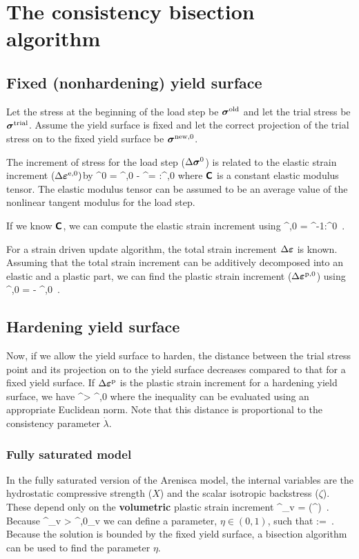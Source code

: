 \section{The consistency bisection algorithm}
\subsection{Fixed (nonhardening) yield surface}
Let the stress at the beginning of the load step be $\boldsymbol{\sigma}^{\text{old}}$ and let the trial stress be 
$\boldsymbol{\sigma}^{\text{trial}}$.  Assume the yield surface is fixed and let the correct projection of the trial 
stress on to the fixed yield surface be $\boldsymbol{\sigma}^{\text{new}, 0}$.

The increment of stress for the load step ($\Delta\boldsymbol{\sigma}^0$) is related to the 
elastic strain increment ($\Delta\boldsymbol{\varepsilon}^{\text{e},0}) $by
\Beq
  \Delta\Bsig^0 = \Bsig^{\Tnew,0} - \Bsig^\Told = \SfC:\Delta\Bveps^{\Te,0}
\Eeq
where $\boldsymbol{\mathsf{C}}$ is a constant elastic modulus tensor.  The elastic modulus tensor can be assumed
to be an average value of the nonlinear tangent modulus for the load step.

If we know $\boldsymbol{\mathsf{C}}$, we can compute the elastic strain increment using
\Beq
  \Delta\Bveps^{\Te,0} = \SfC^{-1}:\Delta\Bsig^0 \,.
\Eeq

For a strain driven update algorithm, the total strain increment $\Delta\boldsymbol{\varepsilon}$ is known.
Assuming that the total strain increment can be additively decomposed into an elastic and a 
plastic part, we can find the plastic strain increment ($\Delta\boldsymbol{\varepsilon}^{\text{p},0}$) using
\Beq
  \Delta\Bveps^{\Tp,0} = \Delta\Bveps - \Delta\Bveps^{\Te,0} \,.
\Eeq

\subsection{Hardening yield surface}
Now, if we allow the yield surface to harden, the distance between the trial stress point and its 
projection on to the yield surface decreases compared to that for a fixed yield surface.  If
$\Delta\boldsymbol{\varepsilon}^{\text{p}}$ is the plastic strain increment for a hardening yield surface, we have
\Beq
  \Delta\Bveps^\Tp > \Delta\Bveps^{\Tp,0}   
\Eeq
where the inequality can be evaluated using an appropriate Euclidean norm.
Note that this distance is proportional to the consistency parameter $\dot{\lambda}$.

\subsubsection{Fully saturated model}
In the fully saturated version of the Arenisca model, the internal variables are the hydrostatic
compressive strength ($X$) and the scalar isotropic backstress ($\zeta$).  These depend only on the
{\bf volumetric} plastic strain increment 
\Beq
  \Delta\Veps^\Tp_v = \Tr(\Delta\Bveps^\Tp) \,.
\Eeq
Because
\Beq
  \Delta\Veps^\Tp_v > \Delta\Veps^{\Tp,0}_v   
\Eeq
we can define a parameter, $\eta \in (0, 1)$, such that
\Beq
  \eta :=  \,.
\Eeq
Because the solution is bounded by the fixed yield surface, a bisection algorithm can be used
to find the parameter $\eta$.

